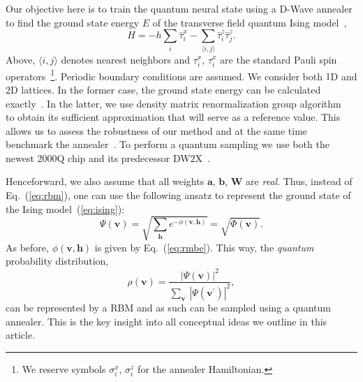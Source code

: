 \documentclass[aps,pra,showpacs,amsmath,amssymb,amsfonts,superscriptaddress,lengthcheck,longbibliography, twocolumn]{revtex4-1}
\newcommand{\bfm}{\boldsymbol}
\begin{document}
Our objective here is to train the quantum neural state using a D-Wave annealer to find the ground 
state energy $E$ of the transverse field quantum Ising model~\cite{Dziarmaga05,Zurek05,Gasenzer18},
%
\begin{equation} 
\label{eq:ising}
H = -h\sum_{i}\hat{\tau}^x_i-\sum_{\langle i, j\rangle}\hat{\tau}^z_i\hat{\tau}^z_{j}.
\end{equation}
%
Above, $\langle i, j\rangle$ denotes nearest neighbors and $\tau^x_i$, $\tau^x_i$ are the standard Pauli spin 
operators~\footnote{We reserve symbols $\sigma^x_i$, $\sigma_i^z$ for the annealer Hamiltonian.}.
Periodic boundary conditions are assumed. We consider both $1$D and $2$D lattices.
In the former case, the ground state energy can be calculated exactly~\cite{Lieb61}. In the latter, we use density
matrix renormalization group algorithm~\cite{Schollwock05,Wall18} to obtain its sufficient approximation that 
will serve as a reference value. This allows us to assess the robustness of our method and at the same time 
benchmark the annealer~\cite{Gardas18}. To perform a quantum sampling we use both the newest $2000$Q 
chip and its predecessor DW$2$X~\cite{Gardas17}.

Henceforward, we also assume that all weights $\bfm a$, $\bfm b$, $\bfm W$ are \emph{real}. Thus, 
instead of Eq.~(\ref{eq:rbm}), one can use the following ansatz to represent the ground state of the Ising model~(\ref{eq:ising}):
%
\begin{equation}
   \label{eq:sa}
   \Psi(\bfm v) = \sqrt{ \sum_{\bfm h } e^{-\phi(\bfm v, \bfm h) } } = \sqrt{\Phi(\bfm v) }.
\end{equation}
%
As before, $\phi(\bfm v, \bfm h)$ is given by Eq.~(\ref{eq:rmbe}). 
This way, the \emph{quantum} probability distribution,
%
\begin{equation}
\label{eq:qdist}
 \rho(\bfm v) = \frac{|\Psi(\bfm v)|^2  }{  \sum_{\bfm v^{\prime}} |\Psi(\bfm v^{\prime})|^2},
\end{equation}
%
can be represented by a RBM and as such can be sampled using a quantum annealer. 
This is the key insight into all conceptual ideas we outline in this article.
%
\end{document}
